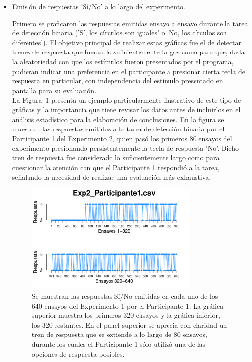 \begin{itemize}
\item Emisión de respuestas 'Sí/No' a lo largo del experimento.

Primero se graficaron las respuestas emitidas ensayo a ensayo durante la tarea de detección binaria ('Sí, los círculos son iguales' o 'No, los círculos son diferentes'). El objetivo principal de realizar estas gráficas fue el de detectar trenes de respuesta que fueran lo suficientemente largos como para que, dada la aleatoriedad con que los estímulos fueron presentados por el programa, pudieran indicar una preferencia en el participante a presionar cierta tecla de respuesta en particular, con independencia del estímulo presentado en pantalla para su evaluación.\\

La Figura~\ref{fig:Resp_E2_P1} presenta un ejemplo particularmente ilustrativo de este tipo de gráficas y la importancia que tiene revisar los datos antes de incluirlos en el análisis estadístico para la elaboración de conclusiones. En la figura se muestran las respuestas emitidas a la tarea de detección binaria por el Participante 1 del Experimento 2, quien pasó los primeros 80 ensayos del experimento presionando persistentemente la tecla de respuesta 'No'. Dicho tren de respuesta fue considerado lo suficientemente largo como para cuestionar la atención con que el Participante 1 respondió a la tarea, señalando la necesidad de realizar una evaluación más exhaustiva.\\ 

\begin{figure}[th]
\centering
\includegraphics[width=0.80\textwidth]{Figures/Response_Exp2_P1} 
\caption[Respuesta emitida por ensayo: Ejemplo de participante sesgado]{Se muestran las respuestas Sí/No emitidas en cada uno de los 640 ensayos del Experimento 1 por el Participante 1. La gráfica superior muestra los primeros 320 ensayos y la gráfica inferior, los 320 restantes. En el panel superior se aprecia con claridad un tren de respuesta que se extiende a lo largo de 80 ensayos, durante los cuales el Participante 1 sólo utilizó una de las opciones de respuesta posibles.}
\label{fig:Resp_E2_P1}
\end{figure}


\end{itemize}
